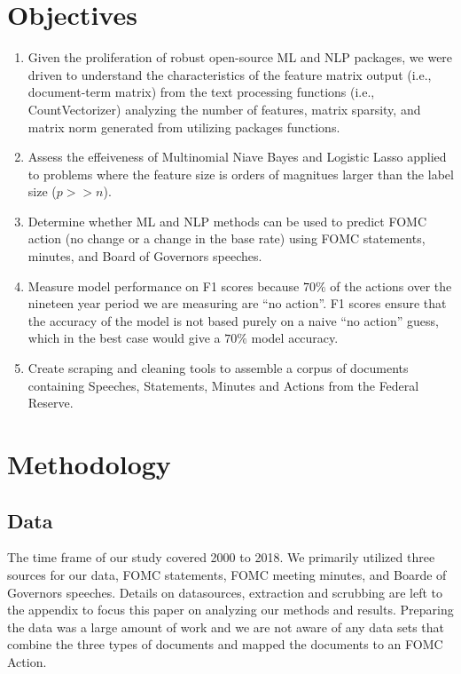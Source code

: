 \documentclass[11pt]{article}
\begin{document}
{\section{Objectives}
\begin{enumerate}
\item Given the proliferation of robust open-source ML and NLP packages, we were driven to understand the characteristics of the feature matrix output (i.e., document-term matrix) from the text processing functions (i.e., CountVectorizer) analyzing the number of features, matrix sparsity, and matrix norm generated from utilizing packages functions.
\item Assess the effeiveness of Multinomial Niave Bayes and Logistic Lasso applied to problems where the feature size is orders of magnitues larger than the label size ($p>>n$).
\item Determine whether ML and NLP methods can be used to predict FOMC action (no change or a change in the base rate) using FOMC statements, minutes, and Board of Governors speeches.
\item Measure model performance on F1 scores because $70\%$ of the actions over the nineteen year period we are measuring are ``no action''.  F1 scores ensure that the accuracy of the model is not based purely on a naive ``no action'' guess, which in the best case would give a $70\%$ model accuracy.
\item Create scraping and cleaning tools to assemble a corpus of documents containing Speeches, Statements, Minutes and Actions from the Federal Reserve.
\end{enumerate}

\section{Methodology}

\subsection{Data}

The time frame of our study covered 2000 to 2018. We primarily utilized three sources for our data, FOMC statements, FOMC meeting minutes, and Boarde of Governors speeches. Details on datasources, extraction and scrubbing are left to the appendix to focus this paper on analyzing our methods and results.  Preparing the data was a large amount of work and we are not aware of any data sets that combine the three types of documents and mapped the documents to an FOMC Action.

}
\end{document}
